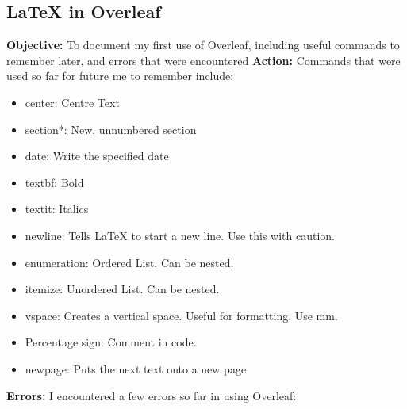 \documentclass{article}
\begin{document}

\newpage
\begin{center}
\section*{LaTeX in Overleaf}
\date{14 August 2019}
\end{center}
\textbf{Objective:} To document my first use of Overleaf, including useful commands to remember later, and errors that were encountered
\newline
\textbf{Action:} Commands that were used so far for future me to remember include:
\begin{itemize}
    \item center: Centre Text
    \item section*: New, unnumbered section
    \item date: Write the specified date
    \item textbf: Bold
    \item textit: Italics
    \item newline: Tells LaTeX to start a new line. Use this with caution.
    \item enumeration: Ordered List. Can be nested.
    \item itemize: Unordered List. Can be nested.
    \item vspace: Creates a vertical space. Useful for formatting. Use mm.
    \item Percentage sign: Comment in code.
    \item newpage: Puts the next text onto a new page
\end{itemize}
\textbf{Errors:} I encountered a few errors so far in using Overleaf:
\end{document}
